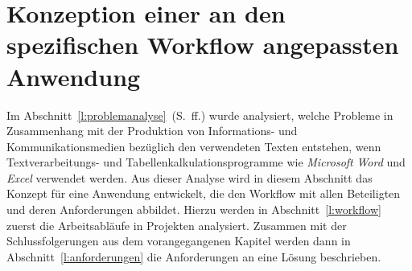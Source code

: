 \section{Konzeption einer an den spezifischen Workflow angepassten Anwendung}

Im Abschnitt~\ref{l:problemanalyse}~(S.\pageref{l:problemanalyse}~ff.) wurde analysiert, welche Probleme in Zusammenhang mit der Produktion von Informations- und Kommunikationsmedien bezüglich den verwendeten Texten entstehen, wenn Textverarbeitungs- und Tabellenkalkulationsprogramme wie \emph{Microsoft} \emph{Word} und \emph{Excel} verwendet werden. Aus dieser Analyse wird in diesem Abschnitt das Konzept für eine Anwendung entwickelt, die den Workflow mit allen Beteiligten und deren Anforderungen abbildet. Hierzu werden in Abschnitt~\ref{l:workflow} zuerst die Arbeitsabläufe in Projekten analysiert. Zusammen mit der Schlussfolgerungen aus dem vorangegangenen Kapitel werden dann in Abschnitt~\ref{l:anforderungen} die Anforderungen an eine Lösung beschrieben. 





